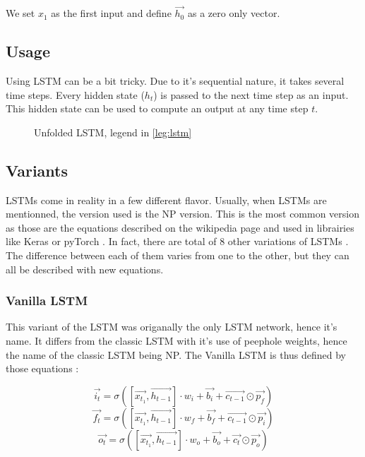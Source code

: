 We set $x_1$ as the first input and define $\overrightarrow{h_0}$ as a zero only vector.

\subsection{Usage}

Using \ac{LSTM} can be a bit tricky. Due to it's sequential nature, it takes several time steps. Every hidden state ($h_t$) is passed to the next time step as an input. This hidden state can be used to compute an output at any time step $t$.

\begin{figure}[H]
  \centering
  
  \caption{Unfolded \acs{LSTM}, legend in \cref{leg:lstm}}
  \label{fig:lstmUse}
\end{figure}

\subsection{Variants}

\acp{LSTM} come in reality in a few different flavor. Usually, when \acp{LSTM} are mentionned, the version used is the \ac{NP} version. This is the most common version as those are the equations described on the wikipedia page \cite{wikiLSTM} and used in librairies like Keras \cite{Keras} or pyTorch \cite{PyTorch}. In fact, there are total of 8 other variations of \acp{LSTM} \cite{nbLSTM}.
The difference between each of them varies from one to the other, but they can all be described with new equations.

\subsubsection{Vanilla \ac{LSTM}}
This variant of the \ac{LSTM} was origanally the only \ac{LSTM} network, hence it's name. It differs from the classic \ac{LSTM} with it's use of peephole weights, hence the name of the classic \ac{LSTM} being \acl{NP}. The Vanilla \ac{LSTM} is thus defined by those equations \cite{vanillaLSTM, nbLSTM} :

\begin{equation}\label{eq:inputGVanilla}
  \overrightarrow{i_t}=\sigma ([\overrightarrow{x_{t_1}},\overrightarrow{h_{t-1}}]\cdot w_i + \overrightarrow{b_i} +\overrightarrow{c_{t-1}}\odot \overrightarrow{p_f})
\end{equation}
\begin{equation}\label{eq:forgetGVanilla}
  \overrightarrow{f_t}=\sigma ([\overrightarrow{x_{t_1}},\overrightarrow{h_{t-1}}]\cdot w_f + \overrightarrow{b_f}+\overrightarrow{c_{t-1}}\odot \overrightarrow{p_i})
\end{equation}
\begin{equation}\label{eq:ouputGVanilla}
  \overrightarrow{o_t}=\sigma ([\overrightarrow{x_{t_1}},\overrightarrow{h_{t-1}}]\cdot w_o + \overrightarrow{b_o}+\overrightarrow{c_{t}}\odot \overrightarrow{p_o})
\end{equation}

